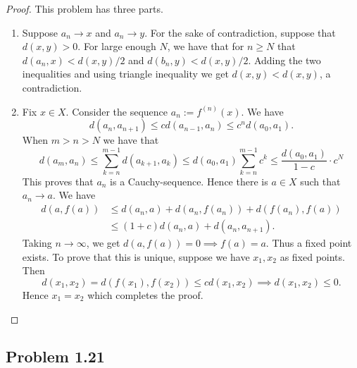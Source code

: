 \documentclass[12pt]{article}
\begin{document}
\begin{proof}
	This problem has three parts. 
	\begin{enumerate}[label = (\alph*)]
		\item Suppose $a_n \to x$ and $a_n \to y$. For the sake of contradiction, suppose that $d(x, y) > 0$. For large enough $N$, we have that for $n \geq N$ that $d(a_n, x) < d(x, y)/2$ and $d(b_n, y) < d(x, y)/2$. Adding the two inequalities and using triangle inequality we get $d(x, y) < d(x, y)$, a contradiction.

		\item Fix $x \in X$. Consider the sequence $a_n := f^{(n)}(x)$. We have 
		\[
			d(a_n, a_{n+1}) \leq c d(a_{n-1}, a_n) \leq c^n d(a_0, a_1). 
		\]
		When $m > n > N$ we have that 
		\[
			d(a_m, a_n) \leq \sum_{k = n}^{m-1} d(a_{k+1}, a_k) \leq d(a_0, a_1) \sum_{k = n}^{m-1} c^k \leq \frac{d(a_0, a_1)}{1-c} \cdot c^N
		\]
		This proves that $a_n$ is a Cauchy-sequence. Hence there is $a \in X$ such that $a_n \to a$. We have
		\begin{align*}
			d(a, f(a)) & \leq d(a_n, a) + d(a_n, f(a_n)) + d(f(a_n), f(a)) \\
			& \leq (1 + c)d(a_n, a) + d(a_n, a_{n+1}).
		\end{align*}
		Taking $n \to \infty$, we get $d(a, f(a)) = 0 \implies f(a) = a$. Thus a fixed point exists. To prove that this is unique, suppose we have $x_1, x_2$ as fixed points. Then 
		\[
			d(x_1, x_2) = d(f(x_1), f(x_2)) \leq c d(x_1, x_2) \implies d(x_1, x_2) \leq 0.
		\]
		Hence $x_1 = x_2$ which completes the proof. 
	\end{enumerate}
\end{proof}

\newpage 

\subsection{Problem 1.21}
\end{document}
